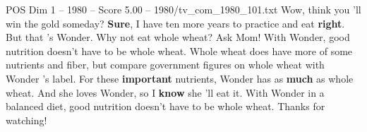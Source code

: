 \begin{textsample}{POS Dim 1 – 1980 – Score 5.00 – 1980/tv\_com\_1980\_101.txt}  \label{ex:f1_pos_045}
Wow, think you 'll win the gold someday? \textbf{Sure}, I have ten more years to practice and eat \textbf{right}.
But that 's Wonder.
Why not eat whole wheat?
Ask Mom!
With Wonder, good nutrition doesn't have to be whole wheat.
Whole wheat does have more of some nutrients and fiber, but compare government figures on whole wheat with Wonder 's label.
For these \textbf{important} nutrients, Wonder has as \textbf{much} as whole wheat.
And she loves Wonder, so I \textbf{know} she 'll eat it.
With Wonder in a balanced diet, good nutrition doesn't have to be whole wheat.
Thanks for watching!

\end{textsample}
